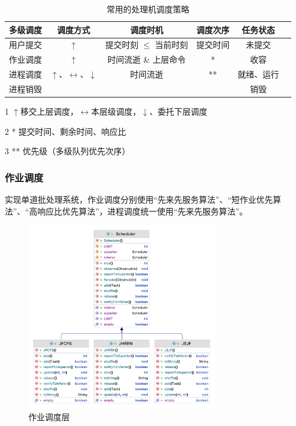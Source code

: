 \documentclass[UTF8]{ctexart}
\begin{document}
\begin{table}[htbp]
    \caption{常用的处理机调度策略}
    \centering

    \begin{threeparttable}
        \begin{tabular}{cccccc}
            \toprule
            多级调度 & 调度方式                                    & 调度时机                 & 调度次序 & 任务状态   \\
            \midrule
            用户提交 & $\uparrow$                                  & 提交时刻 $\leq$ 当前时刻 & 提交时间 & 未提交     \\
            作业调度 & $\uparrow$                                  & 时间流逝 \& 上层命令     & *        & 收容       \\
            进程调度 & $\uparrow$、$\leftrightarrow$、$\downarrow$ & 时间流逝                 & **       & 就绪、运行 \\
            进程销毁 &                                             &                          &          & 销毁       \\
            \bottomrule
        \end{tabular}

        \begin{tablenotes}
            \item [1]   $\uparrow$移交上层调度，$\leftrightarrow$本层级调度，$\downarrow$、委托下层调度
            \item [2]   * 提交时间、剩余时间、响应比
            \item [3]   ** 优先级（多级队列优先次序）
        \end{tablenotes}

    \end{threeparttable}
    \qquad
\end{table}

\subsubsection{作业调度}
实现单道批处理系统，作业调度分别使用“先来先服务算法”、“短作业优先算法”、“高响应比优先算法”，进程调度统一使用“先来先服务算法”。

\begin{figure}[htbp]
    \centering
    \includegraphics[height=232.5pt]{t1-class.png}
    \caption{作业调度层}
\end{figure}
\end{document}
